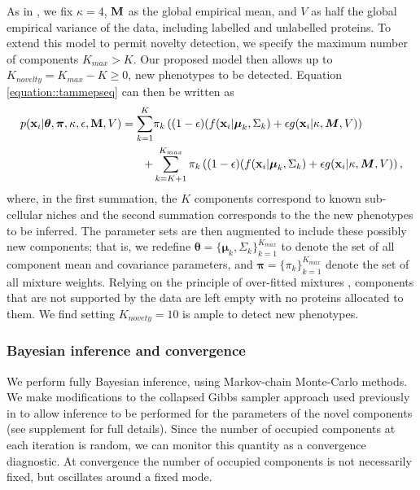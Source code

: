\documentclass[12pt,english]{article}
\begin{document}
As in \cite{Crook:2018}, we fix $\kappa = 4$, ${\bf M}$ as the global empirical mean, and $V$
as half the global empirical variance of the data, including labelled and unlabelled proteins. To extend this model to permit novelty detection, we specify the maximum number of components $K_{max} > K$. Our proposed model then allows up to $K_{novelty} = K_{max} - K \geq 0$, new phenotypes to be detected. Equation \ref{equation::tammepseq} can then be written as 
\begin{equation}\label{equation::tammepseq2}
\begin{split}
p({\bf x}_i| \boldsymbol{\theta}, \boldsymbol{\pi} , \kappa, \epsilon, {\bf M}, V) =  \sum_{k=1}^{K}&\pi_k\left((1-\epsilon)(f({\bf x}_i |\boldsymbol{\mu}_k, \Sigma_k) + \epsilon g({\bf x}_i|\kappa, \boldsymbol{M}, V)\right)\\
+ & \sum_{k=K+1}^{K_{max}}\pi_k\left((1-\epsilon)(f({\bf x}_i |\boldsymbol{\mu}_k, \Sigma_k) + \epsilon g({\bf x}_i|\kappa, \boldsymbol{M}, V)\right),
\end{split}
\end{equation}
where, in the first summation, the $K$ components correspond to known sub-cellular niches and the second summation corresponds to the the new phenotypes to be inferred. The parameter sets are then augmented to include these possibly new components; that is, we redefine 
$\boldsymbol{\theta} = \{\boldsymbol{\mu}_k, \Sigma_k \}_{k = 1}^{K_{max}}$
to denote the set of all component mean and covariance parameters, and
$\boldsymbol{\pi} = \{\pi_k\}_{k = 1}^{K_{max}}$ denote the set of all mixture
weights. Relying on the principle of over-fitted mixtures \cite{Rousseau::2011}, components that are not supported by the data are left empty with no proteins allocated to them. We find setting $K_{novety} = 10$ is ample to detect new phenotypes.   
\subsubsection{Bayesian inference and convergence}
We perform fully Bayesian inference, using Markov-chain Monte-Carlo methods. We make modifications to the collapsed Gibbs sampler approach used previously in \cite{Crook:2018} to allow inference to be performed for the parameters of the novel components (see supplement for full details). Since the number of occupied components at each iteration is random, we can monitor this quantity as a convergence diagnostic. At convergence the number of occupied components is not necessarily fixed, but oscillates around a fixed mode.
\end{document}
